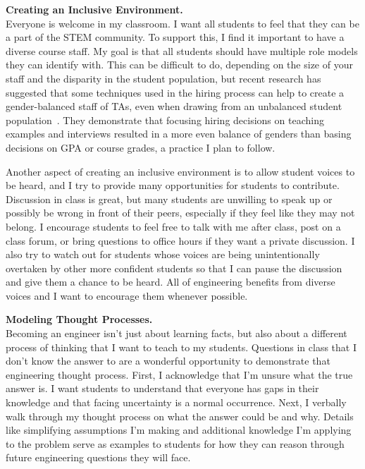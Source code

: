 \documentclass[11pt]{article} %
\begin{document}
\bigskip
\textbf{\textsf{\large Creating an Inclusive Environment.}}\\
Everyone is welcome in my classroom. I want all students to feel that they can
be a part of the STEM community.
%
To support this, I find it important to have a diverse course staff. My goal is
that all students should have multiple role models they can identify with.
%
This can be difficult to do, depending on the size of your staff and the
disparity in the student population, but recent research has suggested that
some techniques used in the hiring process can help to create a gender-balanced
staff of TAs, even when drawing from an unbalanced student
population~\footnotemark{}. They demonstrate that focusing hiring decisions on
teaching examples and interviews resulted in a more even balance of genders
than basing decisions on GPA or course grades, a practice I plan to follow.


Another aspect of creating an inclusive environment is to allow student voices
to be heard, and I try to provide many opportunities for students to
contribute.
%
Discussion in class is great, but many students are unwilling to speak up or
possibly be wrong in front of their peers, especially if they feel like they
may not belong.
%
I encourage students to feel free to talk with me after class, post on a class
forum, or bring questions to office hours if they want a private discussion. I
also try to watch out for students whose voices are being unintentionally
overtaken by other more confident students so that I can pause the discussion
and give them a chance to be heard.
%
All of engineering benefits from diverse voices and I want to encourage them
whenever possible.


\bigskip
\textbf{\textsf{\large Modeling Thought Processes.}}\\
Becoming an engineer isn't just about learning facts, but also about a
different process of thinking that I want to teach to my students. Questions in
class that I don't know the answer to are a wonderful opportunity to
demonstrate that engineering thought process. First, I acknowledge that I'm
unsure what the true answer is. I want students to understand that everyone has
gaps in their knowledge and that facing uncertainty is a normal occurrence.
Next, I verbally walk through my thought process on what the answer could be
and why. Details like simplifying assumptions I'm making and additional
knowledge I'm applying to the problem serve as examples to students for how
they can reason through future engineering questions they will face.
\end{document}

